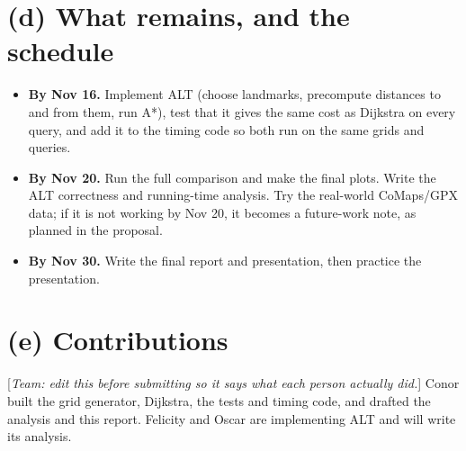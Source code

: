 \documentclass[11pt]{article}
\begin{document}
\section{(d) What remains, and the schedule}

\begin{itemize}
\item \textbf{By Nov 16.} Implement ALT (choose landmarks, precompute distances to and from them, run A*), test that it gives the same cost as Dijkstra on every query, and add it to the timing code so both run on the same grids and queries.
\item \textbf{By Nov 20.} Run the full comparison and make the final plots. Write the ALT correctness and running-time analysis. Try the real-world CoMaps/GPX data; if it is not working by Nov 20, it becomes a future-work note, as planned in the proposal.
\item \textbf{By Nov 30.} Write the final report and presentation, then practice the presentation.
\end{itemize}

\section{(e) Contributions}

[\textit{Team: edit this before submitting so it says what each person actually did.}] Conor built the grid generator, Dijkstra, the tests and timing code, and drafted the analysis and this report. Felicity and Oscar are implementing ALT and will write its analysis.
\end{document}
